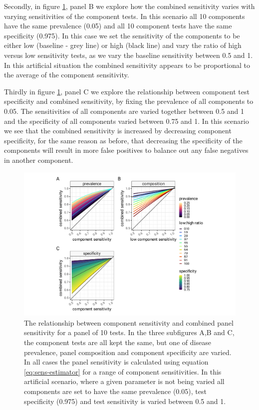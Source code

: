 \documentclass[a4paper, 12pt, twoside]{article}
\begin{document}
Secondly, in figure \ref{fig:A2}, panel B we explore how the combined sensitivity varies with varying sensitivities of the component tests. In this scenario all 10 components have the same prevalence (0.05) and all 10 component tests have the same specificity (0.975). In this case we set the sensitivity of the components to be either low (baseline - grey line) or high (black line) and vary the ratio of high versus low sensitivity tests, as we vary the baseline sensitivity between 0.5 and 1. In this artificial situation the combined sensitivity appears to be proportional to the average of the component sensitivity.

Thirdly in figure \ref{fig:A2}, panel C we explore the relationship between component test specificity and combined sensitivity, by fixing the prevalence of all components to 0.05. The sensitivities of all components are varied together between 0.5 and 1 and the specificity of all components varied between 0.75 and 1. In this scenario we see that the combined sensitivity is increased by decreasing component specificity, for the same reason as before, that decreasing the specificity of the components will result in more false positives to balance out any false negatives in another component.

\begin{figure}[h!]
\centering
  \includegraphics{fig/component-vs-combined-specificity.png}
  \caption{The relationship between component sensitivity and combined panel sensitivity for a panel of 10 tests. In the three subfigures A,B and C, the component tests are all kept the same, but one of disease prevalence, panel composition and component specificity are varied. In all cases the panel sensitivity is calculated using equation \eqref{eq:sens-estimator} for a range of component sensitivities. In this artificial scenario, where a given parameter is not being varied all components are set to have the same prevalence (0.05), test specificity (0.975) and test sensitivity is varied between 0.5 and 1.}
\label{fig:A2}
\end{figure}
\end{document}
